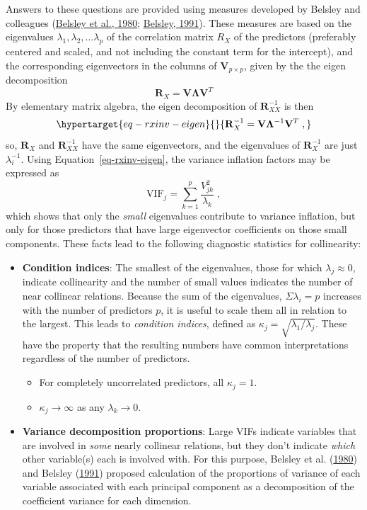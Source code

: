 \documentclass[
  letterpaper,
  10pt,
  krantz2]{krantz}
\providecommand{\tightlist}{%
  \setlength{\itemsep}{0pt}\setlength{\parskip}{0pt}}\usepackage{longtable,booktabs,array}
\begin{document}
Answers to these questions are provided using measures developed by
Belsley and colleagues (\protect\hyperlink{ref-Belsley-etal:80}{Belsley
et al., 1980}; \protect\hyperlink{ref-Belsley:91a}{Belsley, 1991}).
These measures are based on the eigenvalues
\(\lambda_1, \lambda_2, \dots \lambda_p\) of the correlation matrix
\(R_{X}\) of the predictors (preferably centered and scaled, and not
including the constant term for the intercept), and the corresponding
eigenvectors in the columns of \(\mathbf{V}_{p \times p}\), given by the
the eigen decomposition \[
\mathbf{R}_{X} = \mathbf{V} \mathbf{\Lambda} \mathbf{V}^T
\] By elementary matrix algebra, the eigen decomposition of
\(\mathbf{R}_{XX}^{-1}\) is then
\begin{equation}\protect\hypertarget{eq-rxinv-eigen}{}{
\mathbf{R}_{X}^{-1} = \mathbf{V} \mathbf{\Lambda}^{-1} \mathbf{V}^T \; ,
}\label{eq-rxinv-eigen}\end{equation} so, \(\mathbf{R}_{X}\) and
\(\mathbf{R}_{XX}^{-1}\) have the same eigenvectors, and the eigenvalues
of \(\mathbf{R}_{X}^{-1}\) are just \(\lambda_i^{-1}\). Using
Equation~\ref{eq-rxinv-eigen}, the variance inflation factors may be
expressed as \[
\text{VIF}_j = \sum_{k=1}^p \frac{V^2_{jk}}{\lambda_k} \; ,
\] which shows that only the \emph{small} eigenvalues contribute to
variance inflation, but only for those predictors that have large
eigenvector coefficients on those small components. These facts lead to
the following diagnostic statistics for collinearity:

\begin{itemize}
\item
  \textbf{Condition indices}: The smallest of the eigenvalues, those for
  which \(\lambda_j \approx 0\), indicate collinearity and the number of
  small values indicates the number of near collinear relations. Because
  the sum of the eigenvalues, \(\Sigma \lambda_i = p\) increases with
  the number of predictors \(p\), it is useful to scale them all in
  relation to the largest. This leads to \emph{condition indices},
  defined as \(\kappa_j = \sqrt{ \lambda_1 / \lambda_j}\). These have
  the property that the resulting numbers have common interpretations
  regardless of the number of predictors.

  \begin{itemize}
  \tightlist
  \item
    For completely uncorrelated predictors, all \(\kappa_j = 1\).
  \item
    \(\kappa_j \rightarrow \infty\) as any \(\lambda_k \rightarrow 0\).
  \end{itemize}
\item
  \textbf{Variance decomposition proportions}: Large VIFs indicate
  variables that are involved in \emph{some} nearly collinear relations,
  but they don't indicate \emph{which} other variable(s) each is
  involved with. For this purpose, Belsley et al.
  (\protect\hyperlink{ref-Belsley-etal:80}{1980}) and Belsley
  (\protect\hyperlink{ref-Belsley:91a}{1991}) proposed calculation of
  the proportions of variance of each variable associated with each
  principal component as a decomposition of the coefficient variance for
  each dimension.
\end{itemize}
\end{document}
